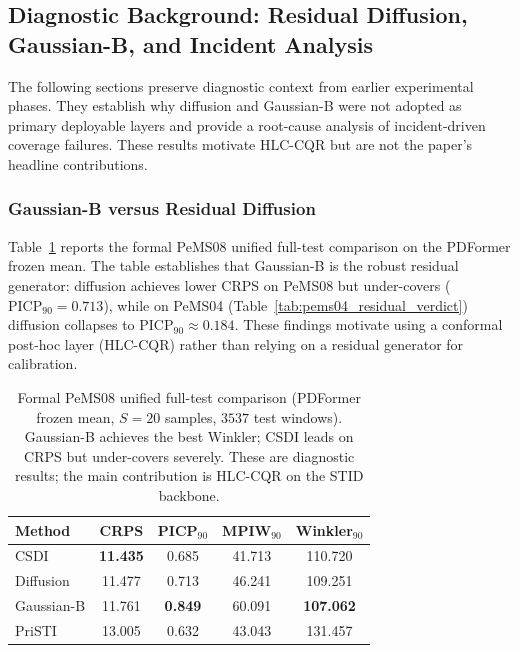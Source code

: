\documentclass[letterpaper,journal]{IEEEtran}
\begin{document}
\subsection{Diagnostic Background: Residual Diffusion, Gaussian-B, and Incident Analysis}
\label{sec:diagnostic_bg}

The following sections preserve diagnostic context from earlier
experimental phases.  They establish why diffusion and Gaussian-B were not
adopted as primary deployable layers and provide a root-cause analysis of
incident-driven coverage failures.  These results motivate HLC-CQR but are
not the paper's headline contributions.

\subsubsection{Gaussian-B versus Residual Diffusion}
Table~\ref{tab:pems08_unified_fulltest} reports the formal PeMS08 unified
full-test comparison on the PDFormer frozen mean.  The table establishes
that Gaussian-B is the robust residual generator: diffusion achieves lower
CRPS on PeMS08 but under-covers ($\text{PICP}_{90}=0.713$), while on
PeMS04 (Table~\ref{tab:pems04_residual_verdict}) diffusion collapses to
$\text{PICP}_{90}\approx0.184$.  These findings motivate using a conformal
post-hoc layer (HLC-CQR) rather than relying on a residual generator for
calibration.

\begin{table}[t]
\centering
\caption{Formal PeMS08 unified full-test comparison (PDFormer frozen mean,
$S=20$ samples, $3537$ test windows).  Gaussian-B achieves the best Winkler;
CSDI leads on CRPS but under-covers severely.  These are diagnostic
results; the main contribution is HLC-CQR on the STID backbone.}
\label{tab:pems08_unified_fulltest}
\footnotesize
\begin{tabular}{lcccc}
\toprule
Method & CRPS & PICP$_{90}$ & MPIW$_{90}$ & Winkler$_{90}$ \\
\midrule
CSDI & \textbf{11.435} & 0.685 & 41.713 & 110.720 \\
Diffusion & 11.477 & 0.713 & 46.241 & 109.251 \\
Gaussian-B & 11.761 & \textbf{0.849} & 60.091 & \textbf{107.062} \\
PriSTI & 13.005 & 0.632 & 43.043 & 131.457 \\
\bottomrule
\end{tabular}
\end{table}
\end{document}
